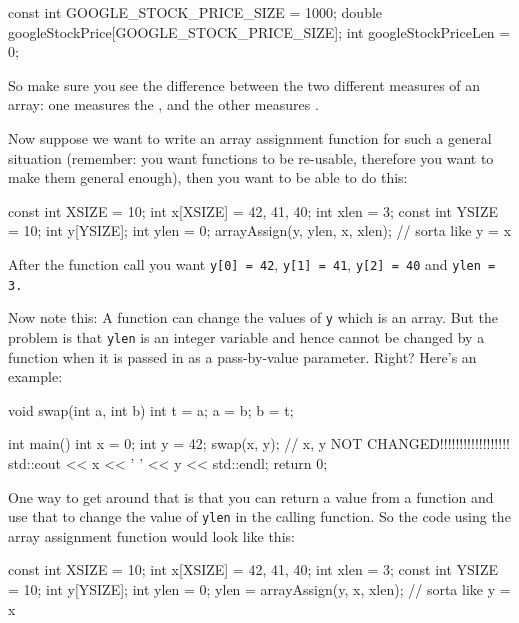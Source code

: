 \begin{consolethree}[escapeinside=||]
const int GOOGLE_STOCK_PRICE_SIZE = 1000;
double googleStockPrice[GOOGLE_STOCK_PRICE_SIZE];
int googleStockPriceLen = 0;
\end{consolethree}

So make sure you see the difference between the two different measures of an array: one measures the , and the other measures .

Now suppose we want to write an array assignment function for such a general situation (remember: you want functions to be re-usable, therefore you want to make them general enough), then you want to be able to do this:

\begin{consolethree}[escapeinside=||]
const int XSIZE = 10;
int x[XSIZE] = {42, 41, 40};
int xlen = 3;
const int YSIZE = 10;
int y[YSIZE];
int ylen = 0;
arrayAssign(y, ylen, x, xlen); // sorta like y = x
\end{consolethree}

After the function call you want \texttt{y[0] = 42}, \texttt{y[1] =
41}, \texttt{y[2] = 40} and \texttt{ylen = 3.}

Now note this: A function can change the values of \texttt{y} which is an array. But the problem is that \texttt{ylen} is an integer variable and hence cannot be changed by a function when it is passed in as a pass-by-value parameter. Right? Here's an example:

\begin{consolethree}[escapeinside=||]
void swap(int a, int b)
{
    int t = a;
    a = b;
    b = t;
}

int main()
{
    int x = 0;
    int y = 42;
    swap(x, y); // x, y NOT CHANGED!!!!!!!!!!!!!!!!!!
    std::cout << x << ' ' << y << std::endl;
    return 0;
}
\end{consolethree}

One way to get around that is that you can return a value from a function and use that to change the value of \texttt{ylen} in the calling function. So the code using the array assignment function would look like this:

\begin{consolethree}[escapeinside=||]
const int XSIZE = 10;
int x[XSIZE] = {42, 41, 40};
int xlen = 3;
const int YSIZE = 10;
int y[YSIZE];
int ylen = 0;
ylen = arrayAssign(y, x, xlen); // sorta like y = x
\end{consolethree}

